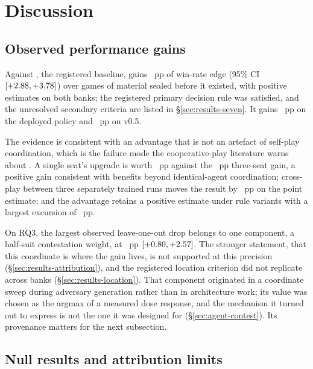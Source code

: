 \section{Discussion}
\label{sec:discussion}

\subsection{Observed performance gains}
\label{sec:discussion-improves}

Against \fcheap{}, the registered baseline, \sestina{} gains \vsevenBtwoFcheap{}~pp of win-rate
edge (95\% CI $[+2.88, +3.78]$) over \vsevenBtwoFcheapN{} games of
material sealed before it existed, with positive estimates on both banks; the registered primary
decision rule was satisfied, and the unresolved secondary criteria are listed in
\S\ref{sec:results-seven}. It gains \vsevenBtwoIncumbent{}~pp on the deployed \vsix{} policy and
\vsevenBtwoVfive{}~pp on v0.5.

The evidence is consistent with an advantage that is not an artefact of self-play coordination,
which is the failure mode the cooperative-play literature warns about
\cite{bard-hanabi,hu-otherplay}. A single seat's upgrade is worth \vsevenOneSeatFive{}~pp against
the \vsevenSoneSelf{}~pp three-seat gain, a positive gain consistent with benefits beyond
identical-agent coordination; cross-play between three separately trained runs moves the result
by \vsevenXpGapAbs{}~pp on the point estimate; and the advantage retains a positive estimate under
\vsevenDiaRowsWord{} rule variants with a largest excursion of \vsevenDiaMaxExcursion{}~pp.

On RQ3, the largest observed leave-one-out drop belongs to one component, a half-suit contestation
weight, at \vsevenLooRtwelve{}~pp $[+0.80, +2.57]$. The stronger
statement, that this coordinate is where the gain lives, is not supported at this precision
(\S\ref{sec:results-attribution}), and the registered location criterion did not replicate across
banks (\S\ref{sec:results-location}). That component originated in a coordinate sweep during adversary generation rather than in
architecture work; its value was chosen as the argmax of a measured dose response, and the mechanism
it turned out to express is not the one it was designed for (\S\ref{sec:agent-contest}). Its
provenance matters for the next subsection.

\subsection{Null results and attribution limits}
\label{sec:discussion-notimproves}

